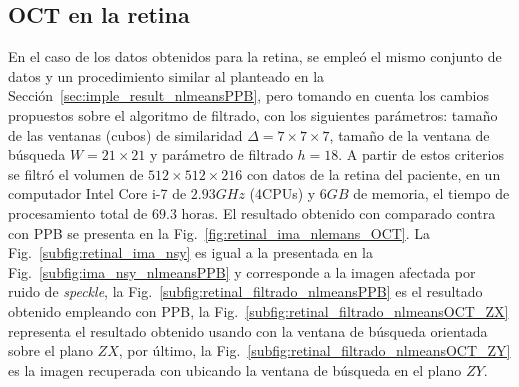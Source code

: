
\subsection{OCT en la retina}
\label{subsec:oct_retinal}

En el caso de los datos obtenidos para la retina, se empleó el mismo conjunto de datos y un procedimiento similar al planteado en la Sección~\ref{sec:imple_result_nlmeansPPB}, pero tomando en cuenta los cambios propuestos sobre el algoritmo de filtrado, con los siguientes parámetros: tamaño de las ventanas (cubos) de similaridad $\Delta = 7\times7\times7$, tamaño de la ventana de búsqueda $W = 21\times21$ y parámetro de filtrado $h = 18$. A partir de estos criterios se filtró el volumen de $512\times512\times216$ con datos de la retina del paciente, en un computador Intel Core i-7 de $2.93GHz$ (4CPUs) y $6GB$ de memoria, el tiempo de procesamiento total de $69.3$ horas. El resultado obtenido con \nlmeansOCT comparado contra \nlmeans con PPB se presenta en la Fig.~\ref{fig:retinal_ima_nlemans_OCT}. La Fig.~\ref{subfig:retinal_ima_nsy} es igual a la presentada en la Fig.~\ref{subfig:ima_nsy_nlmeansPPB} y corresponde a la imagen afectada por ruido de \textit{speckle}, la Fig.~\ref{subfig:retinal_filtrado_nlmeansPPB} es el resultado obtenido empleando \nlmeans con PPB, la Fig.~\ref{subfig:retinal_filtrado_nlmeansOCT_ZX} representa el resultado obtenido usando \nlmeansOCT con la ventana de búsqueda orientada sobre el plano $ZX$, por último, la Fig.~\ref{subfig:retinal_filtrado_nlmeansOCT_ZY} es la imagen recuperada con \nlmeansOCT ubicando la ventana de búsqueda en el plano $ZY$. 

